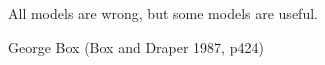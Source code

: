 \documentclass[ignorenonframetext]{beamer}
\begin{document}
\begin{frame}[plain,c]
\begin{center}
All models are wrong, but some models are useful.
\vspace{5mm}

George Box (Box and Draper 1987, p424)
\end{center}
\end{frame}






\end{document}
